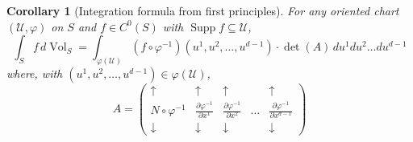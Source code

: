 \documentclass{article}
\newcommand\supp{\operatorname{Supp}}
\renewcommand\det{\operatorname{det}}
\newcommand{\p}{\partial}
\newcommand{\f}[2]{\frac{#1}{#2}}
\theoremstyle{theorem}
\newtheorem{corollary}[theorem]{Corollary}
\newcommand{\Vol}{\operatorname{Vol}}
\begin{document}
\begin{corollary}[Integration formula from first principles]
For any oriented chart $(\mathcal{U},\varphi)$ on $S$ and $f\in C^0(S)$ with $\supp{f} \subseteq \mathcal{U}$,
\begin{equation*}
    \int_S f\,d\Vol_S = \int_{\varphi(\mathcal{U})} (f\circ \varphi^{-1})(u^1,u^2,\dots,u^{d-1}) \cdot {\det{(A)}}\,du^1du^2 \dots du^{d-1} 
\end{equation*}
where, with $(u^1,u^2,\dots, u^{d-1}) \in \varphi(\mathcal{U})$, 
\begin{equation*}
    A = 
    \begin{pmatrix}
    \uparrow &\uparrow & \uparrow &   &\uparrow \\ 
    N \circ \varphi^{-1} &\f{\p \varphi^{-1}}{\p x^1}& \f{\p \varphi^{-1}}{\p x^2}  &\dots&\f{\p \varphi^{-1}}{\p x^{d-1}}\\
    \downarrow  &\downarrow  & \downarrow &    &\downarrow   
    \end{pmatrix}
\end{equation*}
\end{corollary}
\end{document}
